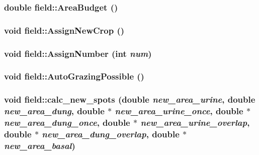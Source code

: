 \label{classfield_a7e446412f0c24c7a58401dab58c10a40}
\hypertarget{classfield_a9c97c30d1b4b2a53e13de987c674cf29}{
\subsubsection[{AreaBudget}]{\setlength{\rightskip}{0pt plus 5cm}double field::AreaBudget ()}}
\label{classfield_a9c97c30d1b4b2a53e13de987c674cf29}
\hypertarget{classfield_acd79798ce9ab3f64c895e48c622e8f0b}{
\subsubsection[{AssignNewCrop}]{\setlength{\rightskip}{0pt plus 5cm}void field::AssignNewCrop ()}}
\label{classfield_acd79798ce9ab3f64c895e48c622e8f0b}
\hypertarget{classfield_a29216588259cbd4b0c9877ee5de0df0b}{
\subsubsection[{AssignNumber}]{\setlength{\rightskip}{0pt plus 5cm}void field::AssignNumber (int {\em num})}}
\label{classfield_a29216588259cbd4b0c9877ee5de0df0b}
\hypertarget{classfield_a62798f048b9b2b4c7c4ba3e5ff6f0694}{
\subsubsection[{AutoGrazingPossible}]{\setlength{\rightskip}{0pt plus 5cm}void field::AutoGrazingPossible ()}}
\label{classfield_a62798f048b9b2b4c7c4ba3e5ff6f0694}
\hypertarget{classfield_abc9f4e1d63c6f056029895d84884e07c}{
\subsubsection[{calc\_\-new\_\-spots}]{\setlength{\rightskip}{0pt plus 5cm}void field::calc\_\-new\_\-spots (double {\em new\_\-area\_\-urine}, \/  double {\em new\_\-area\_\-dung}, \/  double $\ast$ {\em new\_\-area\_\-urine\_\-once}, \/  double $\ast$ {\em new\_\-area\_\-dung\_\-once}, \/  double $\ast$ {\em new\_\-area\_\-urine\_\-overlap}, \/  double $\ast$ {\em new\_\-area\_\-dung\_\-overlap}, \/  double $\ast$ {\em new\_\-area\_\-basal})}}
